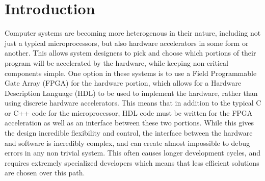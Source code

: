 \chapter{Introduction}
Computer systems are becoming more heterogenous in their nature, including not just a typical microprocessors, but also hardware accelerators in some form or another. This allows system designers to pick and choose which portions of their program will be accelerated by the hardware, while keeping non-critical components simple. 
One option in these systems is to use a Field Programmable Gate Array (FPGA) for the hardware portion, which allows for a Hardware Description Language (HDL) to be used to implement the hardware, rather than using discrete hardware accelerators. This means that in addition to the typical C or C++ code for the microprocessor, HDL code must be written for the FPGA acceleration as well as an interface between these two portions. While this gives the design incredible flexibility and control, the interface between the hardware and software is incredibly complex, and can create almost impossible to debug errors in any non trivial system. This often causes longer development cycles, and requires extremely specialized developers which means that less efficient solutions are chosen over this path.

